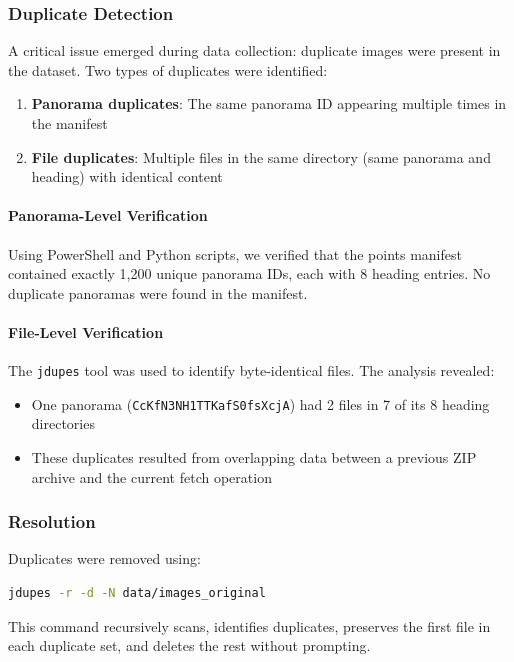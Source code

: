 \documentclass[12pt,a4paper]{article}
\begin{document}
\subsubsection{Duplicate Detection}

A critical issue emerged during data collection: duplicate images were present in the dataset. Two types of duplicates were identified:

\begin{enumerate}
	\item \textbf{Panorama duplicates}: The same panorama ID appearing multiple times in the manifest
	\item \textbf{File duplicates}: Multiple files in the same directory (same panorama and heading) with identical content
\end{enumerate}

\paragraph{Panorama-Level Verification}
Using PowerShell and Python scripts, we verified that the points manifest contained exactly 1,200 unique panorama IDs, each with 8 heading entries. No duplicate panoramas were found in the manifest.

\paragraph{File-Level Verification}
The \texttt{jdupes} tool was used to identify byte-identical files. The analysis revealed:
\begin{itemize}
	\item One panorama (\texttt{CcKfN3NH1TTKafS0fsXcjA}) had 2 files in 7 of its 8 heading directories
	\item These duplicates resulted from overlapping data between a previous ZIP archive and the current fetch operation
\end{itemize}

\subsubsection{Resolution}

Duplicates were removed using:

\begin{lstlisting}[language=bash]
jdupes -r -d -N data/images_original
\end{lstlisting}

This command recursively scans, identifies duplicates, preserves the first file in each duplicate set, and deletes the rest without prompting.
\end{document}
